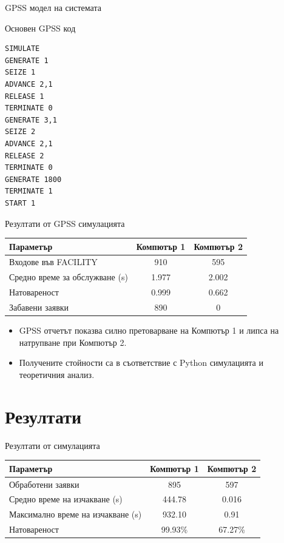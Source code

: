 \documentclass[aspectratio=169]{beamer}
\begin{document}
\begin{frame}[fragile]{GPSS модел на системата}
    \small
    \begin{block}{Основен GPSS код}
\scriptsize
\begin{verbatim}
SIMULATE
GENERATE 1
SEIZE 1
ADVANCE 2,1
RELEASE 1
TERMINATE 0
GENERATE 3,1
SEIZE 2
ADVANCE 2,1
RELEASE 2
TERMINATE 0
GENERATE 1800
TERMINATE 1
START 1
\end{verbatim}
    \end{block}
\end{frame}

\begin{frame}{Резултати от GPSS симулацията}
    \small
    \begin{table}
        \centering
        \begin{tabular}{lcc}
            \toprule
            \textbf{Параметър} & \textbf{Компютър 1} & \textbf{Компютър 2} \\
            \midrule
            Входове във FACILITY & 910 & 595 \\
            Средно време за обслужване (s) & 1.977 & 2.002 \\
            Натовареност & 0.999 & 0.662 \\
            Забавени заявки & 890 & 0 \\
            \bottomrule
        \end{tabular}
    \end{table}

    \vspace{0.3cm}

    \begin{itemize}
        \item GPSS отчетът показва силно претоварване на Компютър 1 и липса на натрупване при Компютър 2.
        \item Получените стойности са в съответствие с Python симулацията и теоретичния анализ.
    \end{itemize}
\end{frame}

\section{Резултати}

\begin{frame}{Резултати от симулацията}
    \begin{table}
        \centering
        \begin{tabular}{>{\raggedright\arraybackslash}p{4.4cm}cc}
            \toprule
            \textbf{Параметър} & \textbf{Компютър 1} & \textbf{Компютър 2} \\
            \midrule
            Обработени заявки & 895 & 597 \\
            Средно време на изчакване (s) & 444.78 & 0.016 \\
            Максимално време на изчакване (s) & 932.10 & 0.91 \\
            Натовареност & 99.93\% & 67.27\% \\
            \bottomrule
        \end{tabular}
    \end{table}
\end{frame}
\end{document}
